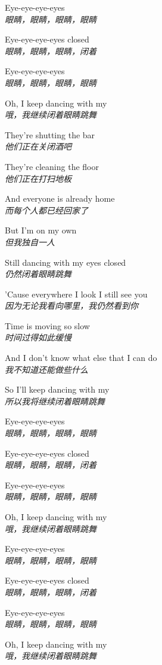 \begin{spacing}{1.5}
\begin{flushleft}
Eye-eye-eye-eyes\\
\textit{眼睛，眼睛，眼睛，眼睛}\lyricspace

Eye-eye-eye-eyes closed\\
\textit{眼睛，眼睛，眼睛，闭着}\lyricspace

Eye-eye-eye-eyes\\
\textit{眼睛，眼睛，眼睛，眼睛}\lyricspace

Oh, I keep dancing with my\\
\textit{哦，我继续闭着眼睛跳舞}\lyricspace

They're shutting the bar\\
\textit{他们正在关闭酒吧}\lyricspace

They're cleaning the floor\\
\textit{他们正在打扫地板}\lyricspace

And everyone is already home\\
\textit{而每个人都已经回家了}\lyricspace

But I'm on my own\\
\textit{但我独自一人}\lyricspace

Still dancing with my eyes closed\\
\textit{仍然闭着眼睛跳舞}\lyricspace

'Cause everywhere I look I still see you\\
\textit{因为无论我看向哪里，我仍然看到你}\lyricspace

Time is moving so slow\\
\textit{时间过得如此缓慢}\lyricspace

And I don't know what else that I can do\\
\textit{我不知道还能做些什么}\lyricspace

So I'll keep dancing with my\\
\textit{所以我将继续闭着眼睛跳舞}\lyricspace

Eye-eye-eye-eyes\\
\textit{眼睛，眼睛，眼睛，眼睛}\lyricspace

Eye-eye-eye-eyes closed\\
\textit{眼睛，眼睛，眼睛，闭着}\lyricspace

Eye-eye-eye-eyes\\
\textit{眼睛，眼睛，眼睛，眼睛}\lyricspace

Oh, I keep dancing with my\\
\textit{哦，我继续闭着眼睛跳舞}\lyricspace

Eye-eye-eye-eyes\\
\textit{眼睛，眼睛，眼睛，眼睛}\lyricspace

Eye-eye-eye-eyes closed\\
\textit{眼睛，眼睛，眼睛，闭着}\lyricspace

Eye-eye-eye-eyes\\
\textit{眼睛，眼睛，眼睛，眼睛}\lyricspace

Oh, I keep dancing with my\\
\textit{哦，我继续闭着眼睛跳舞}\lyricspace
\end{flushleft}
\end{spacing} 
